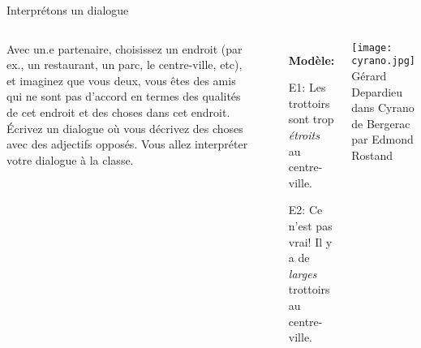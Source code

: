 \begin{frame}{Interprétons un dialogue}
  \begin{columns}
      \small
      Avec un.e partenaire, choisissez un endroit (par ex., un restaurant, un parc, le centre-ville, etc), et imaginez que vous deux, vous êtes des amis qui ne sont pas d'accord en termes des qualités de cet endroit et des choses dans cet endroit.
      Écrivez un dialogue où vous décrivez des choses avec des adjectifs opposés.
      Vous allez interpréter votre dialogue à la classe.
      \begin{itemize}
        \item[] \textbf{Modèle:}
        \item[E1:] Les trottoirs sont trop \emph{étroits} au centre-ville.
        \item[E2:] Ce n'est pas vrai! Il y a de \emph{larges} trottoirs au centre-ville.
      \end{itemize}
      \begin{center}
        \texttt{[image: cyrano.jpg]} \\
        \scriptsize Gérard Depardieu dans Cyrano de Bergerac par Edmond Rostand
      \end{center}
  \end{columns}
\end{frame}
